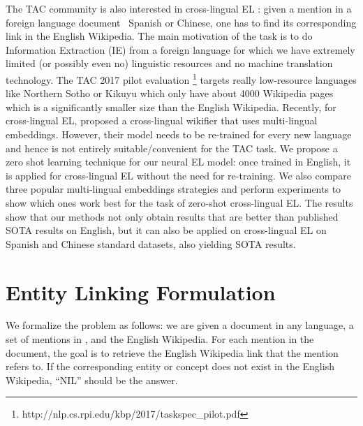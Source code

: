\documentclass[letterpaper]{article} \usepackage{aaai18}  \usepackage{times}  \usepackage{helvet}  \usepackage{courier}  \usepackage{url}  \usepackage{graphicx}  \frenchspacing  \setlength{\pdfpagewidth}{8.5in}  \setlength{\pdfpageheight}{11in}  \usepackage{latexsym}
\begin{document}
The TAC community is also interested in cross-lingual EL \cite{tsai2016cross,sil2016one}: given a mention in a foreign language document \eg\ Spanish or Chinese, one has to find its corresponding link in the English Wikipedia. The main motivation of the task is to do Information Extraction (IE) from a foreign language for which we have extremely limited (or possibly even no) linguistic resources and no machine translation technology. The TAC 2017 pilot evaluation \footnote{http://nlp.cs.rpi.edu/kbp/2017/taskspec\_pilot.pdf} targets really low-resource languages like Northern Sotho or Kikuyu which only have about 4000 Wikipedia pages which is a significantly smaller size than the English Wikipedia. Recently, for cross-lingual EL, \cite{tsai2016cross} proposed a cross-lingual wikifier that uses multi-lingual embeddings. However, their model needs to be re-trained for every new language and hence is not entirely suitable/convenient for the TAC task. We propose a zero shot learning technique \cite{palatucci2009zero,socher2013zero} for our neural EL model: once trained in English, it is applied for cross-lingual EL without the need for re-training. We also compare three popular multi-lingual embeddings strategies and perform experiments to show which ones work best for the task of zero-shot cross-lingual EL. The results show that our methods not only obtain results that are better than published SOTA results on English, but it can also be applied on cross-lingual EL on Spanish and Chinese standard datasets, also yielding SOTA results.






























 \section{Entity Linking Formulation}
We formalize the problem as follows: we are given
a document  in any language, a set of mentions
 in , and the English
Wikipedia. For each mention in the document, the
goal is to retrieve the English Wikipedia link that the
mention refers to. If the corresponding entity or concept
does not exist in the English Wikipedia, ``NIL”
should be the answer.
\end{document}
